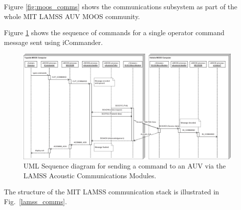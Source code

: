 \documentclass[11pt, letterpaper, oneside]{memoir}
\begin{document}
Figure \ref{fig:moos_comms} shows the communications subsystem as part of the whole
MIT LAMSS AUV MOOS community.




 Figure \ref{acomms_sequence} shows the sequence of commands for a single operator command message sent using iCommander.
 
 
\begin{figure}[tp]
  \centering 
  \includegraphics[width=1\textwidth]{acomms_sequence.eps}
\caption{UML Sequence diagram for sending a command to an AUV via the LAMSS Acoustic Communications Modules. \label{acomms_sequence}}
\end{figure}


The structure of the MIT LAMSS communication stack
is illustrated in Fig.~\ref{lamss_comms}.
\end{document}
